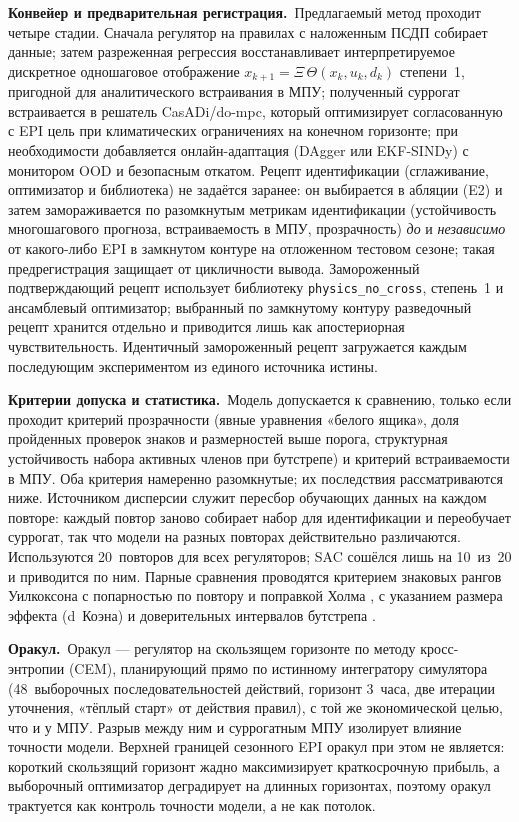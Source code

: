 \documentclass[preprint,3p]{elsarticle}
\begin{document}
\textbf{Конвейер и предварительная регистрация.}~Предлагаемый метод проходит четыре стадии.
Сначала регулятор на правилах с наложенным ПСДП собирает данные; затем разреженная регрессия
восстанавливает интерпретируемое дискретное одношаговое отображение
$x_{k+1}=\Xi\,\Theta(x_k,u_k,d_k)$ степени~1, пригодной для аналитического встраивания в МПУ;
полученный суррогат встраивается в решатель CasADi/do-mpc, который оптимизирует согласованную с
EPI цель при климатических ограничениях на конечном горизонте; при необходимости добавляется
онлайн-адаптация (DAgger или EKF-SINDy) с монитором OOD и безопасным откатом. Рецепт идентификации (сглаживание, оптимизатор и
библиотека) не задаётся заранее: он выбирается в абляции (E2) и затем замораживается по
разомкнутым метрикам идентификации (устойчивость многошагового прогноза, встраиваемость в МПУ,
прозрачность) \emph{до} и \emph{независимо} от какого-либо EPI в замкнутом контуре на
отложенном тестовом сезоне; такая предрегистрация защищает от цикличности вывода. Замороженный
подтверждающий рецепт использует библиотеку \texttt{physics\_no\_cross}, степень~1 и
ансамблевый оптимизатор; выбранный по замкнутому контуру разведочный рецепт хранится отдельно
и приводится лишь как апостериорная чувствительность. Идентичный замороженный рецепт
загружается каждым последующим экспериментом из единого источника истины.

\textbf{Критерии допуска и статистика.}~Модель допускается к сравнению, только если проходит
критерий прозрачности (явные уравнения «белого ящика», доля пройденных проверок знаков и
размерностей выше порога, структурная устойчивость набора активных членов при бутстрепе) и
критерий встраиваемости в МПУ. Оба критерия намеренно разомкнутые; их последствия
рассматриваются ниже. Источником дисперсии служит пересбор обучающих данных на каждом повторе:
каждый повтор заново собирает набор для идентификации и переобучает суррогат, так что модели
на разных повторах действительно различаются. Используются 20~повторов для всех регуляторов;
SAC сошёлся лишь на 10~из~20 и приводится по ним. Парные сравнения проводятся критерием
знаковых рангов Уилкоксона с попарностью по повтору \citep{wilcoxon1945} и поправкой Холма
\citep{holm1979}, с указанием размера эффекта (d~Коэна) и доверительных интервалов бутстрепа
\citep{efron1994bootstrap,demsar2006}.

\textbf{Оракул.}~Оракул — регулятор на скользящем горизонте по методу кросс-энтропии (CEM),
планирующий прямо по истинному интегратору симулятора (48~выборочных последовательностей
действий, горизонт 3~часа, две итерации уточнения, «тёплый старт» от действия правил), с той
же экономической целью, что и у МПУ. Разрыв между ним и суррогатным МПУ изолирует влияние
точности модели. Верхней границей сезонного EPI оракул при этом не является: короткий
скользящий горизонт жадно максимизирует краткосрочную прибыль, а выборочный оптимизатор
деградирует на длинных горизонтах, поэтому оракул трактуется как контроль точности модели, а
не как потолок.
\end{document}
